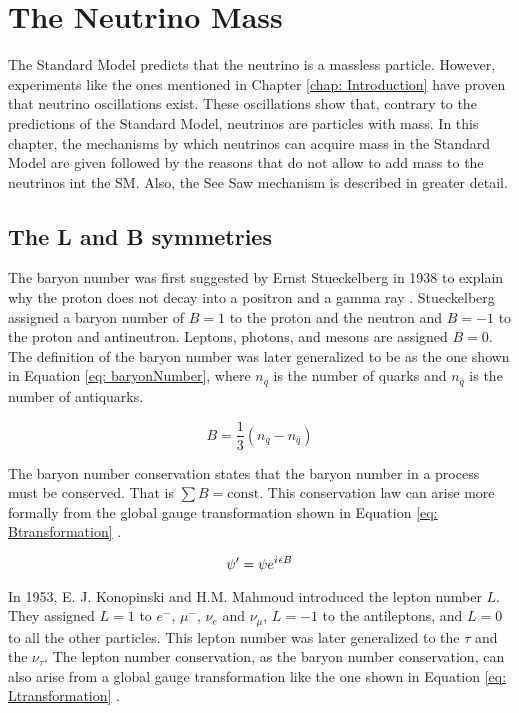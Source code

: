 \chapter{The Neutrino Mass}

The Standard Model predicts that the neutrino is a massless particle. However, experiments like the ones mentioned in Chapter \ref{chap: Introduction} have proven that neutrino oscillations exist. These oscillations show that, contrary to the predictions of the Standard Model, neutrinos are particles with mass. In this chapter, the mechanisms by which neutrinos can acquire mass in the Standard Model are given followed by the reasons that do not allow to add mass to the neutrinos int the SM. Also, the See Saw mechanism is described in greater detail. 

\section{The L and B symmetries} 

The baryon number was first suggested by Ernst Stueckelberg in 1938 to explain why the proton does not decay into a positron and a gamma ray \cite{b-l symmetry}. Stueckelberg assigned a baryon number of $B = 1$ to the proton and the neutron and $B = -1$ to the proton and antineutron. Leptons, photons, and mesons are assigned $B = 0$. The definition of the baryon number was later generalized to be as the one shown in Equation \ref{eq: baryonNumber}, where $n_{q}$ is the number of quarks and $n_{\bar{q}}$ is the number of antiquarks.


\begin{equation}\label{eq: baryonNumber}
B = \frac{1}{3}\left(n_{q} - n_{\bar{q}}\right)
\end{equation}

The baryon number conservation states that the baryon number in a process must be conserved. That is $\sum B = \text{const}$. This conservation law can arise more formally from the global gauge transformation shown in Equation \ref{eq: Btransformation} \cite{b-l symmetry}.

\begin{equation}\label{eq: Btransformation}
\psi^{\prime} = \psi e^{{i\mkern1mu} \epsilon B} 
\end{equation}

In 1953, E. J. Konopinski and H.M. Mahmoud introduced the lepton number $L$. They assigned $L = 1$ to $e^{-}$, $\mu^{-}$, $\nu_{e}$ and $\nu_{\mu}$, $L = -1$ to the antileptons, and $L = 0$ to all the other particles. This lepton number was later generalized to the $\tau$ and the $\nu_{\tau}$. The lepton number conservation, as the baryon number conservation, can also arise from a global gauge transformation like the one shown in Equation \ref{eq: Ltransformation} \cite{b-l symmetry}.

